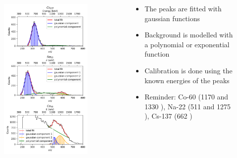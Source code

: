 \begin{frame}[plain]
    \begin{columns}
        \begin{column}{0.5\textwidth}
            \begin{figure}
                \centering
                \includegraphics[width=0.85\textwidth]{images/pmt_spectra.png}
            \end{figure}
        \end{column}
        \begin{column}{0.5\textwidth}
            \begin{itemize}
                \item The peaks are fitted with gaussian functions
                \item Background is modelled with a polynomial or exponential function
                \item Calibration is done using the known energies of the peaks
                \item Reminder: Co-60 (1170 and 1330 \keV), Na-22 (511 \keV and 1275 \keV), Cs-137 (662 \keV)
            \end{itemize}
        \end{column}
    \end{columns}
\end{frame}

